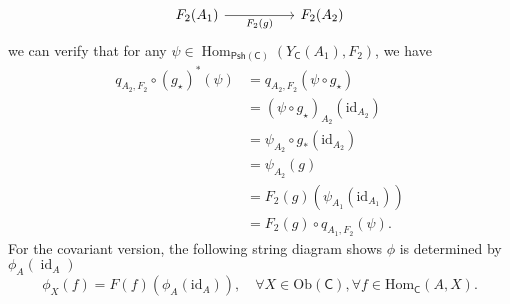 {\[\begin{tikzcd}[row sep=3.5em, column sep=2.5em, ampersand replacement=\&]
        {F_2(A_1)} \arrow[rr, "F_2(g)"']      \&  \& {F_2(A_2)}               
    \end{tikzcd}
    \]
    we can verify that for any $\psi\in \operatorname{Hom}_{\mathsf{Psh}(\mathsf{C})}\left(Y_\mathsf{C}(A_1),F_2\right)$, we have
    \begin{align*}
        q_{A_2,F_2}\circ \left(g_\star\right)^*(\psi)&=q_{A_2,F_2}\left(\psi\circ g_\star\right)\\
        &=\left(\psi\circ g_\star\right)_{A_2}\left(\mathrm{id}_{A_2}\right)\\
        &=\psi_{A_2}\circ g_*\left(\mathrm{id}_{A_2}\right)\\
        &=\psi_{A_2}(g)\\
        &=F_2(g)(\psi_{A_1}(\mathrm{id}_{A_1}))\\
        &=F_2(g)\circ q_{A_1,F_2}(\psi).
    \end{align*}
}
\noindent For the covariant version, the following string diagram shows $\phi$ is determined by $\phi_A\left(\operatorname{id}_A\right)$
\[
        \phi_X(f)=F(f)(\phi_A(\mathrm{id}_A)),\quad\forall X\in \mathrm{Ob}(\mathsf{C}),\forall f\in \mathrm{Hom}_{\mathsf{C}}(A,X).
\]
